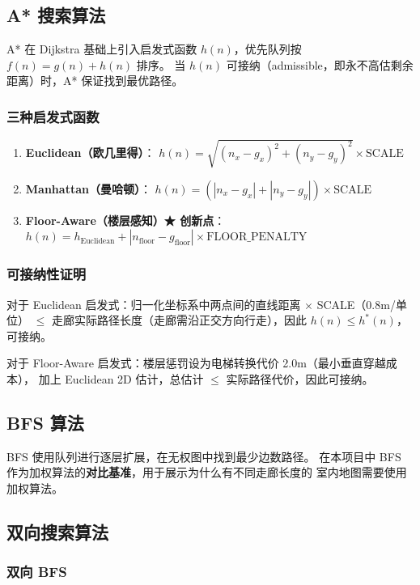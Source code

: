 \documentclass[11pt,a4paper]{ctexart}
\begin{document}
\subsection{A* 搜索算法}

A* 在 Dijkstra 基础上引入启发式函数 $h(n)$，优先队列按 $f(n)=g(n)+h(n)$ 排序。
当 $h(n)$ 可接纳（admissible，即永不高估剩余距离）时，A* 保证找到最优路径。

\subsubsection{三种启发式函数}

\begin{enumerate}
    \item \textbf{Euclidean（欧几里得）}：
    $h(n) = \sqrt{(n_x - g_x)^2 + (n_y - g_y)^2} \times \text{SCALE}$
    \item \textbf{Manhattan（曼哈顿）}：
    $h(n) = (|n_x-g_x| + |n_y-g_y|) \times \text{SCALE}$
    \item \textbf{Floor-Aware（楼层感知）\quad ★ 创新点}：
    $h(n) = h_{\text{Euclidean}} + |n_{\text{floor}} - g_{\text{floor}}| \times \text{FLOOR\_PENALTY}$
\end{enumerate}

\subsubsection{可接纳性证明}

对于 Euclidean 启发式：归一化坐标系中两点间的直线距离 $\times$ SCALE（0.8m/单位）
$\leq$ 走廊实际路径长度（走廊需沿正交方向行走），因此 $h(n) \leq h^*(n)$，可接纳。

对于 Floor-Aware 启发式：楼层惩罚设为电梯转换代价 2.0m（最小垂直穿越成本），
加上 Euclidean 2D 估计，总估计 $\leq$ 实际路径代价，因此可接纳。

\subsection{BFS 算法}

BFS 使用队列进行逐层扩展，在无权图中找到最少边数路径。
在本项目中 BFS 作为加权算法的\textbf{对比基准}，用于展示为什么有不同走廊长度的
室内地图需要使用加权算法。

\subsection{双向搜索算法}

\subsubsection{双向 BFS}
\end{document}
